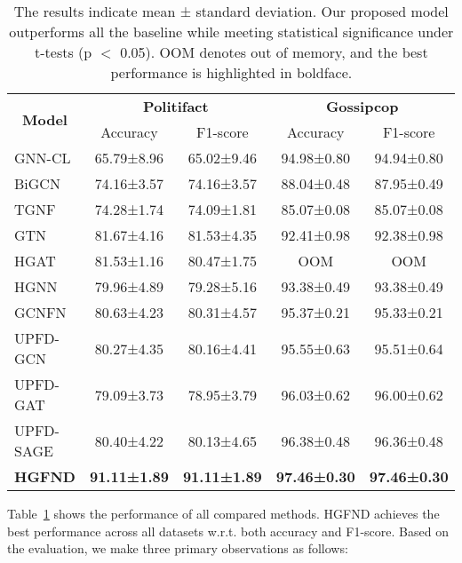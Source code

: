 \documentclass[conference]{IEEEtran}
\begin{document}
\begin{table}
\centering
\caption{The results indicate mean ± standard deviation. Our proposed model outperforms all the baseline while meeting statistical significance under t-tests (p $<$ 0.05). OOM denotes out of memory, and the best performance is highlighted in boldface.}\label{result_full_tab}

\begin{tabular}{lcccc}
\hline
\multicolumn{1}{c}{\multirow{2}{*}{\textbf{Model}}}                        & \multicolumn{2}{c}{\textbf{Politifact}}                        & \multicolumn{2}{c}{\textbf{Gossipcop}}                         \\ \cmidrule(l){2-3} \cmidrule(l){4-5} 
\multicolumn{1}{c}{}                        &
\multicolumn{1}{c}{Accuracy} & \multicolumn{1}{c}{F1-score} & \multicolumn{1}{c}{Accuracy} & \multicolumn{1}{c}{F1-score} \\
\hline
\hline

GNN-CL& 65.79±8.96 & 65.02±9.46 &94.98±0.80& 94.94±0.80\\
BiGCN & 74.16±3.57 & 74.16±3.57 & 88.04±0.48&87.95±0.49\\
TGNF & 74.28±1.74 & 74.09±1.81& 85.07±0.08& 85.07±0.08\\
GTN  & 81.67±4.16& 81.53±4.35& 92.41±0.98&92.38±0.98\\
HGAT  & 81.53±1.16&80.47±1.75 & OOM & OOM\\


HGNN & 79.96±4.89 & 79.28±5.16 & 93.38±0.49 & 93.38±0.49\\
GCNFN & 80.63±4.23& 80.31±4.57 & 95.37±0.21&95.33±0.21\\
UPFD-GCN& 80.27±4.35& 80.16±4.41& 95.55±0.63&95.51±0.64\\
UPFD-GAT & 79.09±3.73&78.95±3.79 & 96.03±0.62&96.00±0.62\\
UPFD-SAGE & 80.40±4.22 & 80.13±4.65 & 96.38±0.48 & 96.36±0.48\\


\textbf{HGFND}&\textbf{91.11±1.89} & \textbf{91.11±1.89} & \textbf{97.46±0.30} & \textbf{97.46±0.30}\\
\hline
\end{tabular}
\end{table}

Table~\ref{result_full_tab} shows the performance of all compared methods. HGFND achieves the best performance across all datasets w.r.t. both accuracy and F1-score. Based on the evaluation, we make three primary observations as follows:
\end{document}
